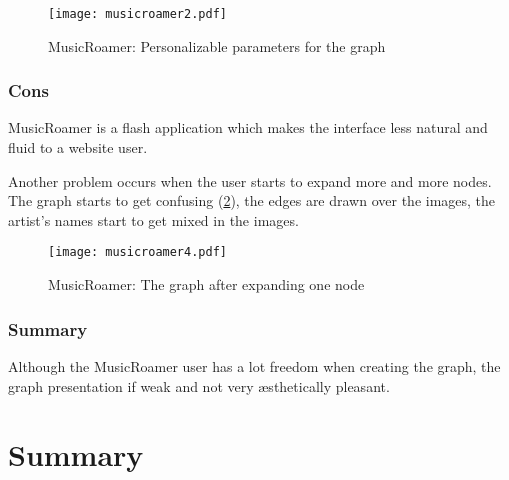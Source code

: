       \begin{figure}[!h]
        \begin{center}
          \texttt{[image: musicroamer2.pdf]}
        \end{center}
        \caption{MusicRoamer: Personalizable parameters for the graph }
        \label{fig:sota_musicroamer3}
      \end{figure}


    \subsubsection{Cons} %
    \label{ssub:cons}

      MusicRoamer is a flash application which makes the interface less natural and fluid to a website user.

      Another problem occurs when the user starts to expand more and more nodes.
      The graph starts to get confusing (\ref{fig:sota_musicroamer4}), the edges are drawn over the images, the artist's names start to get mixed in the images.

      \begin{figure}
        \begin{center}
          \texttt{[image: musicroamer4.pdf]}
        \end{center}
        \caption{MusicRoamer: The graph after expanding one node}
        \label{fig:sota_musicroamer4}
      \end{figure}


    \subsubsection{Summary} %
    \label{ssub:summary}

      Although the MusicRoamer user has a lot freedom when creating the graph, the graph presentation if weak and not very æsthetically pleasant.



  \clearpage




\section{Summary}


